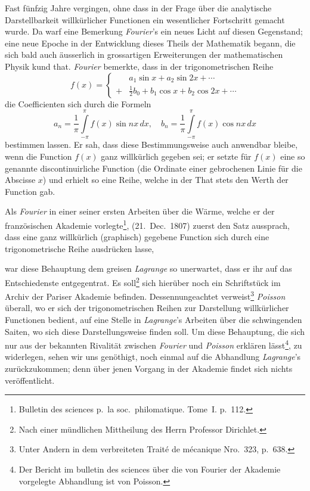 \documentclass[12pt,a4paper]{article}
\begin{document}
Fast fünfzig Jahre vergingen, ohne dass in der Frage über die analytische Darstellbarkeit willkürlicher Functionen ein wesentlicher Fortschritt gemacht wurde. Da warf eine Bemerkung \textit{Fourier}'s ein neues Licht auf diesen Gegenstand; eine neue Epoche in der Entwicklung dieses Theils der Mathematik begann, die sich bald auch äusserlich in grossartigen Erweiterungen der mathematischen Physik kund that. \textit{Fourier} bemerkte, dass in der trigonometrischen Reihe
\[ f(x) = \begin{cases} &a_1\sin x + a_2\sin 2x + \cdots\\ + &\tfrac{1}{2}b_0 + b_1\cos x + b_2\cos 2x + \cdots \end{cases} \]
die Coefficienten sich durch die Formeln
\[ a_n = \frac{1}{\pi}\int\limits_{-\pi}^{\pi} f(x)\sin nx\,dx,\quad b_n = \frac{1}{\pi}\int\limits_{-\pi}^{\pi} f(x)\cos nx\,dx \]
bestimmen lassen. Er sah, dass diese Bestimmungsweise auch anwendbar bleibe, wenn die Function $f(x)$ ganz willkürlich gegeben sei; er setzte für $f(x)$ eine so genannte discontinuirliche Function (die Ordinate einer gebrochenen Linie für die Abscisse $x$) und erhielt so eine Reihe, welche in der That stets den Werth der Function gab.

Als \textit{Fourier} in einer seiner ersten Arbeiten über die Wärme, welche er der französischen Akademie vorlegte\footnote{Bulletin des sciences p.~la soc.~philomatique. Tome~I. p.~112.}, (21.~Dec.\ 1807) zuerst den Satz aussprach, dass eine ganz willkürlich (graphisch) gegebene Function sich durch eine trigonometrische Reihe ausdrücken lasse,

\newpage

war diese Behauptung dem greisen \textit{Lagrange} so unerwartet, dass er ihr auf das Entschiedenste entgegentrat. Es soll\footnote{Nach einer mündlichen Mittheilung des Herrn Professor Dirichlet.} sich hierüber noch ein Schriftstück im Archiv der Pariser Akademie befinden. Dessennungeachtet verweist\footnote{Unter Andern in dem verbreiteten Traité de mécanique Nro.~323, p.~638.} \textit{Poisson} überall, wo er sich der trigonometrischen Reihen zur Darstellung willkürlicher Functionen bedient, auf eine Stelle in \textit{Lagrange}'s Arbeiten über die schwingenden Saiten, wo sich diese Darstellungsweise finden soll. Um diese Behauptung, die sich nur aus der bekannten Rivalität zwischen \textit{Fourier} und \textit{Poisson} erklären lässt\footnote{Der Bericht im bulletin des sciences über die von Fourier der Akademie vorgelegte Abhandlung ist von Poisson.}, zu widerlegen, sehen wir uns genöthigt, noch einmal auf die Abhandlung \textit{Lagrange}'s zurückzukommen; denn über jenen Vorgang in der Akademie findet sich nichts veröffentlicht.
\end{document}
